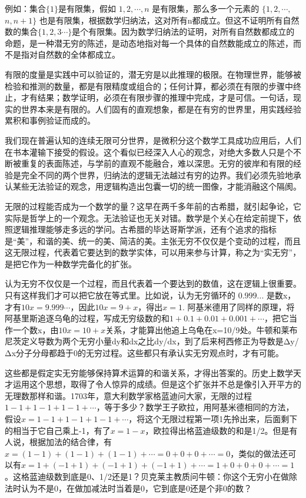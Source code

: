 \kaishu
\setlength{\leftskip}{1em}
例如：集合$ \{1\} $是有限集，假如 $ {1,2,\cdots,n} $ 是有限集，那么多一个元素的 $ \{1,2,\cdots,$$n,n+1\} $ 也是有限集，根据数学归纳法，这对所有n都成立。但这不证明所有自然数的集合$ \{1,2,3 \cdots\} $是个有限集。因为数学归纳法的证明，对所有自然数都成立的命题，是一种潜无穷的陈述，是动态地指对每一个具体的自然数能成立的陈述，而不是指对自然数的全体都成立。

\songti
\setlength{\leftskip}{0em}
有限的度量是实践中可以验证的，潜无穷是以此推理的极限。在物理世界，能够被检验和推测的数量，都是有限精度或组合的；任何计算，都必须在有限的步骤中终止，才有结果；数学证明，必须在有限步骤的推理中完成，才是可信。一句话，现实的世界本来是有限的。人们固有的直观想象，都是在有穷的世界里，用实践经验累积和事例验证而成的。

我们现在普遍认知的连续无限可分世界，是微积分这个数学工具成功应用后，人们在书本灌输下接受的假设。这个看似已经深入人心的观念，对绝大多数人只是个不断被重复的表面陈述，与学前的直观不能融合，难以深思。无穷的彼岸和有限的经验是完全不同的两个世界，归纳法的逻辑无法越过有穷的边界。我们必须先验地承认某些无法验证的观念，用逻辑构造出包囊一切的统一图像，才能消融这个隔阂。

无限的过程能否成为一个数学的量？这早在两千多年前的古希腊，就引起争论，它实际是哲学上的一个观念。无法验证也无关对错。数学是个关心在给定前提下，依照逻辑推理能够走多远的学问。古希腊的毕达哥斯学派，还有个追求的指标是``美''，和谐的美、统一的美、简洁的美。主张无穷不仅仅是个变动的过程，而且这无限过程，代表着它要达到的数学实体，可以用来参与计算，称之为``实无穷''，是把它作为一种数学完备化的扩张。

认为无穷不仅仅是一个过程，而且代表着一个要达到的数值，这在逻辑上很重要。只有这样我们才可以把它放在等式里。比如说，认为无穷循环的 $ 0.999... $ 是数x，才有$ 10x=9.999\cdots $，因此$ 10x = 9 + x $，得出$ x = 1 $. 阿基米德用了同样的原理，将阿基里斯追逐乌龟的过程，写成无穷级数的和$ 1+0.1+0.01+0.001+\cdots $，把它当作一个数x，由$ 10x=10+x $关系，才能算出他追上乌龟在x=10/9处。牛顿和莱布尼茨定义导数为两个无穷小量dy和dx之比dy/dx，到了后来柯西修正为导数是Δy/Δx分子分母都趋于0的无穷过程。这些都只有承认实无穷观点时，才有可能。

这些都是假定实无穷能够保持算术运算的和谐关系，才得出答案的。历史上数学天才运用这个思想，取得了令人惊异的成绩。但是这个扩张并不总是像引入开平方的无理数那样和谐。1703年，意大利数学家格蓝迪问大家，无限的过程$ 1-1+1-1+1-1+\cdots $，等于多少？数学王子欧拉，用阿基米德相同的方法，假设$ x=1-1+1-1+1-1+\cdots $，将这个无限过程第一项1先拎出来，后面剩下的相当于它自己乘上-1，有了$  x=1-x $，欧拉得出格蓝迪级数的和是1/2。但是有人说，根据加法的结合律，有$ x=(1-1)+(1-1)+(1-1)+\cdots=0+0+0+\cdots=0 $，类似的做法还可以有$ x=1+(-1+1)+(-1+1)+(-1+1)+\cdots=1+0+0+0+\cdots=1 $。这格蓝迪级数到底是0、1/2还是1？贝克莱主教质问牛顿：你这个无穷小在做除法时认为不是0，在做加减法时当着是0，它到底是0还是个非0的数？

